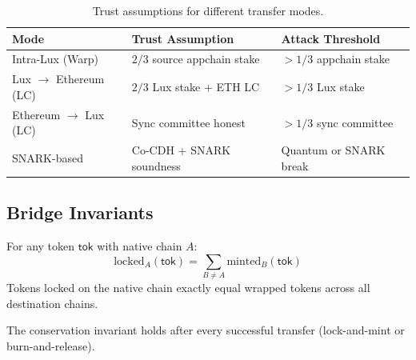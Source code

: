 \begin{table}[H]
\centering
\caption{Trust assumptions for different transfer modes.}
\label{tab:trust}
\begin{tabular}{p{3.5cm}p{4cm}p{4cm}}
\toprule
\textbf{Mode} & \textbf{Trust Assumption} & \textbf{Attack Threshold} \\
\midrule
Intra-Lux (Warp) & $2/3$ source appchain stake & $> 1/3$ appchain stake \\
Lux $\to$ Ethereum (LC) & $2/3$ Lux stake + ETH LC & $> 1/3$ Lux stake \\
Ethereum $\to$ Lux (LC) & Sync committee honest & $> 1/3$ sync committee \\
SNARK-based & Co-CDH + SNARK soundness & Quantum or SNARK break \\
\bottomrule
\end{tabular}
\end{table}

\subsection{Bridge Invariants}

\begin{definition}
For any token $\mathsf{tok}$ with native chain $A$:
\begin{equation}
    \text{locked}_A(\mathsf{tok}) = \sum_{B \neq A} \text{minted}_B(\mathsf{tok})
\end{equation}
Tokens locked on the native chain exactly equal wrapped tokens across all destination chains.
\end{definition}

\begin{lemma}
The conservation invariant holds after every successful transfer (lock-and-mint or burn-and-release).
\end{lemma}


